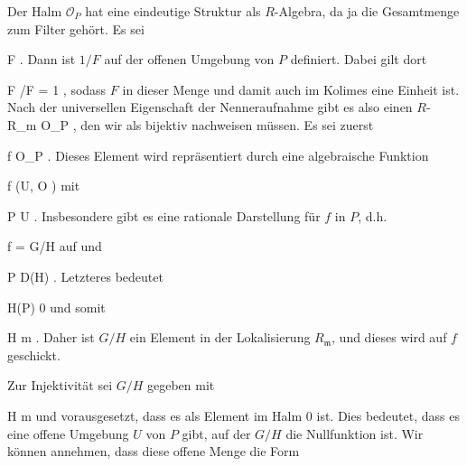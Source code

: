 {





Der Halm ${\mathcal O}_P$ hat eine eindeutige Struktur als $R$-Algebra, da ja die Gesamtmenge zum Filter gehört. Es sei

 {}
 {F \not{}} {}
 {} {} {} {.}
Dann ist $1/F$ auf der offenen Umgebung
 von $P$ definiert. Dabei gilt dort

\mavergleichskette
{\vergleichskette
{ F /F
}
{ = }{ 1
}
{  }{
}
{    }{
}
{   }{
}
}
{}{}{,}
sodass $F$ in dieser Menge und damit auch im Kolimes eine Einheit ist. Nach der universellen Eigenschaft der Nenneraufnahme gibt es also einen
$R$-
\maabbdisp {} { R_{\mathfrak m} } { {\mathcal O}_P
} {,}
den wir als bijektiv nachweisen müssen. Es sei zuerst

\mavergleichskette
{\vergleichskette
{ f
}
{ \in }{ {\mathcal O}_P
}
{  }{
}
{    }{
}
{   }{
}
}
{}{}{.}
Dieses Element wird repräsentiert durch eine algebraische Funktion

\mavergleichskette
{\vergleichskette
{ f
}
{ \in }{ \Gamma (U, {\mathcal O} )
}
{  }{
}
{    }{
}
{   }{
}
}
{}{}{}
mit

\mavergleichskette
{\vergleichskette
{ P
}
{ \in }{ U
}
{  }{
}
{    }{
}
{   }{
}
}
{}{}{.}
Insbesondere gibt es eine rationale Darstellung für $f$ in $P$, d.h.

\mavergleichskette
{\vergleichskette
{ f
}
{ = }{ G/H
}
{  }{
}
{    }{
}
{   }{
}
}
{}{}{}
auf
 und

\mavergleichskette
{\vergleichskette
{ P
}
{ \in }{ D(H)
}
{  }{
}
{    }{
}
{   }{
}
}
{}{}{.}
Letzteres bedeutet

\mavergleichskette
{\vergleichskette
{ H(P)
}
{ \neq }{ 0
}
{  }{
}
{    }{
}
{   }{
}
}
{}{}{}
und somit

\mavergleichskette
{\vergleichskette
{ H
}
{ \notin }{ {\mathfrak m}
}
{  }{
}
{    }{
}
{   }{
}
}
{}{}{.}
Daher ist $G/H$ ein Element in der Lokalisierung $R_{\mathfrak m}$, und dieses wird auf $f$ geschickt.

Zur Injektivität sei $G/H$ gegeben mit

\mavergleichskette
{\vergleichskette
{ H
}
{ \notin }{ {\mathfrak m}
}
{  }{
}
{    }{
}
{   }{
}
}
{}{}{}
und vorausgesetzt, dass es als Element im Halm $0$ ist. Dies bedeutet, dass es eine offene Umgebung $U$ von $P$ gibt, auf der $G/H$ die Nullfunktion ist. Wir können annehmen, dass diese offene Menge die Form

}
